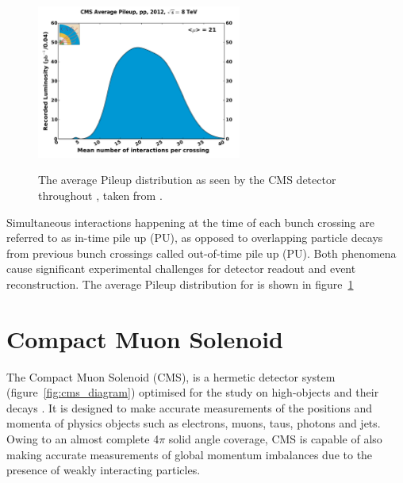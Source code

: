 \begin{figure}
  \centering
  \includegraphics[width=0.6\textwidth]{Figs/machine/pileup_pp_2012.pdf}
  \label{fig:pileup_runone}
  \caption{The average Pileup distribution as seen by the CMS detector
  throughout \runone, taken from \cite{cmslumi}.}
\end{figure}

Simultaneous interactions happening at the time
of each bunch crossing are referred to as in-time pile up (PU), as opposed to 
overlapping particle decays from previous bunch crossings called out-of-time 
pile up (PU). Both phenomena cause significant
experimental challenges for detector readout and event reconstruction.
The average Pileup distribution for \runone is shown in
figure~\ref{fig:pileup_runone}




\section{Compact Muon Solenoid}  %
\label{sec:detector_overview}

The Compact Muon Solenoid (CMS), is a
hermetic detector system (figure~\ref{fig:cms_diagram})
optimised for the study on high-\Pt objects and their decays \cite
{CMSexperiment}.
It is designed to make accurate measurements of the positions and momenta of
physics objects such as electrons, muons, taus,
photons and jets. Owing to an almost complete 4$\pi$ solid angle coverage, CMS is 
capable of also making accurate measurements of global momentum imbalances due
to the presence of weakly interacting particles.

